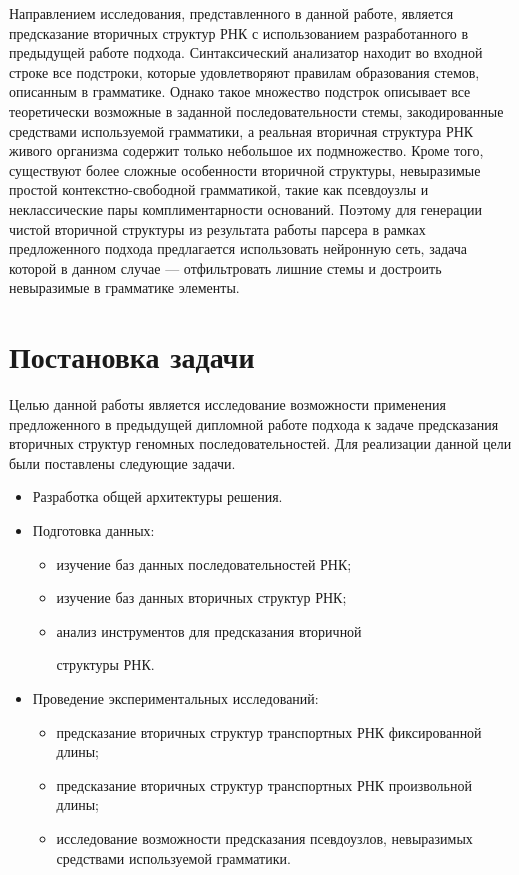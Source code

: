 \documentclass[14pt]{matmex-diploma-custom}
\begin{document}
Направлением исследования, представленного в данной работе, является предсказание вторичных структур РНК с использованием разработанного в предыдущей работе подхода. Синтаксический анализатор находит во входной строке все подстроки, которые удовлетворяют правилам образования стемов, описанным в грамматике. Однако такое множество подстрок описывает все теоретически возможные в заданной последовательности стемы, закодированные средствами используемой грамматики, а реальная вторичная структура РНК живого организма содержит только небольшое их подмножество. Кроме того, существуют более сложные особенности вторичной структуры, невыразимые простой контекстно-свободной грамматикой, такие как псевдоузлы и неклассические пары комплиментарности оснований. Поэтому для генерации чистой вторичной структуры из результата работы парсера в рамках предложенного подхода предлагается использовать нейронную сеть, задача которой в данном случае --- отфильтровать лишние стемы и достроить невыразимые в грамматике элементы.

\section{Постановка задачи}
Целью данной работы является исследование возможности применения предложенного в предыдущей дипломной работе подхода к задаче предсказания вторичных структур геномных последовательностей. Для реализации данной цели были поставлены следующие задачи.
\begin{itemize}
    \item Разработка общей архитектуры решения.
    \item Подготовка данных:
    \begin{itemize}
        \item изучение баз данных последовательностей РНК;
        \item изучение баз данных вторичных структур РНК;
        \item анализ инструментов для предсказания вторичной
        
        структуры РНК.
    \end{itemize} 
    \item Проведение экспериментальных исследований:
    \begin{itemize}
        \item предсказание вторичных структур транспортных РНК фиксированной длины;
        \item предсказание вторичных структур транспортных РНК произвольной длины;
        \item исследование возможности предсказания псевдоузлов, невыразимых средствами используемой грамматики.
    \end{itemize}
\end{itemize}
\end{document}
